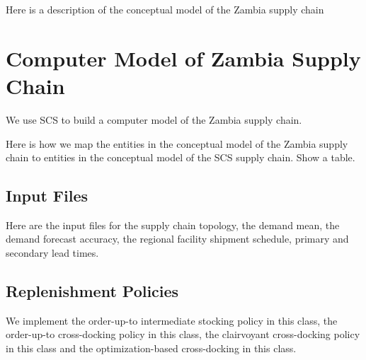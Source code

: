 \documentclass[12pt,twocolumn]{article}
\begin{document}
Here is a description of the conceptual model of the Zambia supply chain





\section{Computer Model of Zambia Supply Chain}

We use SCS to build a computer model of the Zambia supply chain.

Here is how we map the entities
in the conceptual model of the Zambia supply chain
to entities in the conceptual model of the SCS supply chain.
Show a table.

\subsection{Input Files}

Here are the input files for the supply chain topology,
the demand mean, the demand forecast accuracy,
the regional facility shipment schedule,
primary and secondary lead times.

\subsection{Replenishment Policies}

We implement the order-up-to intermediate stocking policy in this class,
the order-up-to cross-docking policy in this class,
the clairvoyant cross-docking policy in this class
and the optimization-based cross-docking in this class.
\end{document}
